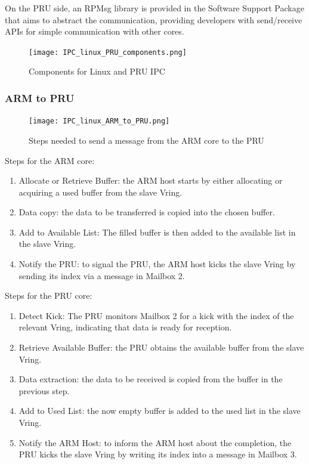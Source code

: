 On the PRU side, an RPMsg library is provided in the Software Support Package
that aims to abstract the communication, providing developers with send/receive
APIs for simple communication with other cores.

\begin{figure}[H]
    \centering
    \texttt{[image: IPC\_linux\_PRU\_components.png]}
    \caption{Components for Linux and PRU IPC}
\end{figure}

\subsubsection{ARM to PRU}

\begin{figure}[htb]
    \centering
    \texttt{[image: IPC\_linux\_ARM\_to\_PRU.png]}
    \caption{Steps needed to send a message from the ARM core to the PRU}
\end{figure}

Steps for the ARM core:

\begin{enumerate}
    \item   Allocate or Retrieve Buffer: the ARM host starts by either
            allocating or acquiring a used buffer from the slave Vring.
    \item   Data copy: the data to be transferred is copied into the chosen
            buffer.
    \item   Add to Available List: The filled buffer is then added to the
            available list in the slave Vring.
    \item   Notify the PRU: to signal the PRU, the ARM host kicks the slave
            Vring by sending its index via a message in Mailbox 2.
\end{enumerate}

Steps for the PRU core:

\begin{enumerate}
    \item   Detect Kick: The PRU monitors Mailbox 2 for a kick with the index
            of the relevant Vring, indicating that data is ready for reception.
    \item   Retrieve Available Buffer: the PRU obtains the available buffer
            from the slave Vring.
    \item   Data extraction: the data to be received is copied from the buffer
            in the previous step.
    \item   Add to Used List: the now empty buffer is added to the used list
            in the slave Vring.
    \item   Notify the ARM Host: to inform the ARM host about the completion,
            the PRU kicks the slave Vring by writing its index into a message
            in Mailbox 3.
\end{enumerate}

